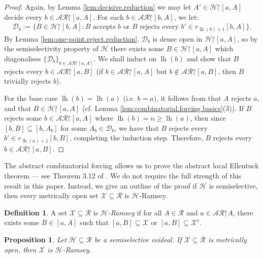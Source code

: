 \documentclass[11pt,reqno]{amsart}
\theoremstyle{plain}
\numberwithin{equation}{section}
\newtheorem{proposition}[theorem]{Proposition}
\theoremstyle{definition}
\newtheorem{definition}[theorem]{Definition}
\newcommand{\func}{\operatorname}
\newcommand{\cal}{\mathcal}
\newcommand{\restrictedto}{\mathord{\upharpoonright}}
\newcommand{\X}{\cal{X}}
\renewcommand{\H}{\cal{H}}
\newcommand{\lh}{\func{lh}}
\newcommand{\D}{\cal{D}}
\begin{document}
\begin{proof}
    Again, by Lemma \ref{lem:decisive.reduction} we may let $A' \in \H\restrictedto[a,A]$ decide every $b \in \cal{AR}\restrictedto[a,A]$. For each $b \in \cal{AR}\restrictedto[b,A]$, we let:
    \begin{align*}
        \D_b := \{B \in \H\restrictedto[b,A] : \text{$B$ accepts $b$ or $B$ rejects every $b' \in r_{\lh(b)+1}[b,A]$}\}.
    \end{align*}
    By Lemma \ref{lem:one-point.reject.reduction}, $\D_b$ is dense open in $\H\restrictedto[a,A]$, so by the semiselectivity property of $\H$ there exists some $B \in \H\restrictedto[a,A]$ which diagonalises $\{\D_b\}_{b\in\cal{AR}\restrictedto[a,A]}$. We shall induct on $\lh(b)$ and show that $B$ rejects every $b \in \cal{AR}\restrictedto[a,B]$ (if $b \in \cal{AR}\restrictedto[a,A]$ but $b \notin \cal{AR}\restrictedto[a,B]$, then $B$ trivially rejects $b$).

    For the base case $\lh(b) = \lh(a)$ (i.e. $b = a$), it follows from that $A$ rejects $a$, and that $B \in \H\restrictedto[a,A]$ (cf. Lemma \ref{lem:combinatorial.forcing.basics}(3)). If $B$ rejects some $b \in \cal{AR}\restrictedto[a,A]$ where $\lh(b) = n \geq \lh(a)$, then since $[b,B] \subseteq [b,A_b]$ for some $A_b \in \D_b$, we have that $B$ rejects every $b' \in r_{\lh(a)+1}[b,B]$, completing the induction step. Therefore, $B$ rejects every $b \in \cal{AR}\restrictedto[a,B]$.
\end{proof}

The abstract combinatorial forcing allows us to prove the abstract local Ellentuck theorem --- see Theorem 3.12 of \cite{DMN15}. We do not require the full strength of this result in this paper. Instead, we give an outline of the proof if $\H$ is semiselective, then every metrically open set $\X \subseteq \cal{R}$ is $\H$-Ramsey.

\begin{definition}
    A set $\X \subseteq \cal{R}$ is \emph{$\H$-Ramsey} if for all $A \in \cal{R}$ and $a \in \cal{AR}\restrictedto A$, there exists some $B \in [a,A]$ such that $[a,B] \subseteq \X$ or $[a,B] \subseteq \X^c$.
\end{definition}

\begin{proposition}
\label{prop:open.is.H-ramsey}
    Let $\H \subseteq \cal{R}$ be a semiselective coideal. If $\X \subseteq \cal{R}$ is metrically open, then $\X$ is $\H$-Ramsey.
\end{proposition}
\end{document}
